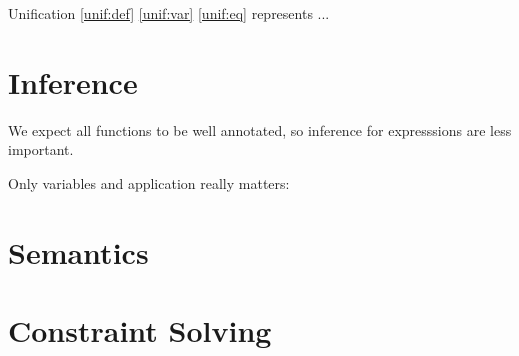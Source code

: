 \documentclass{article}
\begin{document}
Unification \ref{unif:def} \ref{unif:var} \ref{unif:eq} represents ...

\section{Inference}

We expect all functions to be well annotated, so inference for expresssions are less important.

Only variables and application really matters:

\begin{prooftree}
\end{prooftree}

\begin{prooftree}
\end{prooftree}



\section{Semantics}

\section{Constraint Solving}
\end{document}
